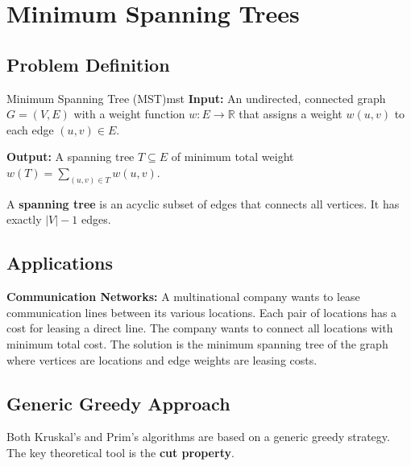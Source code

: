 \section*{Minimum Spanning Trees}

\subsection{Problem Definition}

\begin{definition}{Minimum Spanning Tree (MST)}{mst}
\textbf{Input:} An undirected, connected graph $G = (V, E)$ with a weight function 
$w: E \to \mathbb{R}$ that assigns a weight $w(u,v)$ to each edge $(u,v) \in E$.

\textbf{Output:} A spanning tree $T \subseteq E$ of minimum total weight 
$w(T) = \sum_{(u,v) \in T} w(u,v)$.

A \textbf{spanning tree} is an acyclic subset of edges that connects all vertices. 
It has exactly $|V| - 1$ edges.
\end{definition}

\subsection{Applications}

\textbf{Communication Networks:} A multinational company wants to lease communication lines 
between its various locations. Each pair of locations has a cost for leasing a direct line. 
The company wants to connect all locations with minimum total cost. The solution is the 
minimum spanning tree of the graph where vertices are locations and edge weights are 
leasing costs.

\subsection{Generic Greedy Approach}

Both Kruskal's and Prim's algorithms are based on a generic greedy strategy. The key 
theoretical tool is the \textbf{cut property}.

